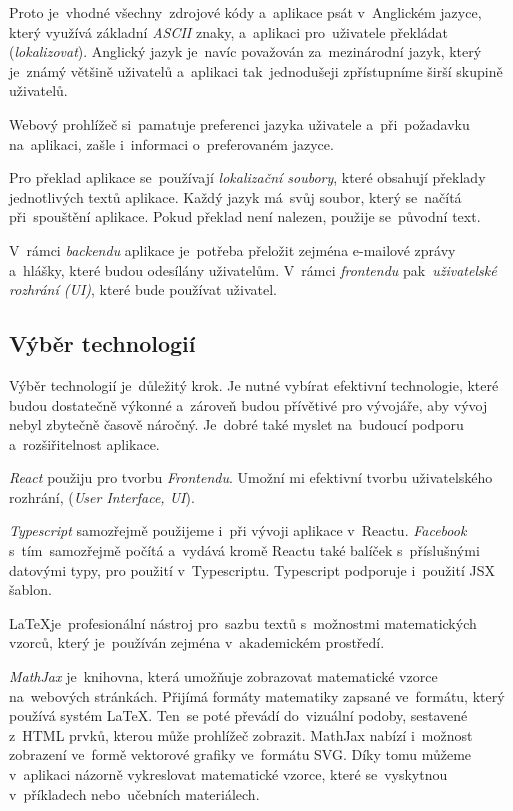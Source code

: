 \documentclass[10pt,a4paper]{article}
\begin{document}
        Proto je~vhodné všechny~zdrojové kódy a~aplikace psát v~Anglickém jazyce, který využívá základní \emph{ASCII} znaky, a~aplikaci pro~uživatele překládat (\emph{lokalizovat}). Anglický jazyk je~navíc považován za~mezinárodní jazyk, který je~známý většině uživatelů a~aplikaci tak~jednodušeji zpřístupníme širší skupině uživatelů.
        
        Webový prohlížeč si~pamatuje preferenci jazyka uživatele a~při~požadavku na~aplikaci, zašle i~informaci o~preferovaném jazyce.

        Pro překlad aplikace se~používají \emph{lokalizační soubory}, které obsahují překlady jednotlivých textů aplikace. Každý jazyk má~svůj soubor, který se~načítá při~spouštění aplikace. Pokud překlad není nalezen, použije se~původní text.

        V~rámci \emph{backendu} aplikace je~potřeba přeložit zejména e-mailové zprávy a~hlášky, které budou odesílány uživatelům. V~rámci \emph{frontendu} pak~\emph{uživatelské rozhrání (UI)}, které bude používat uživatel.

        \subsection{Výběr technologií}
            Výběr technologií je~důležitý krok. Je nutné vybírat efektivní technologie, které budou dostatečně výkonné a~zároveň budou
            přívětivé pro vývojáře, aby vývoj nebyl zbytečně časově náročný. Je~dobré také myslet na~budoucí podporu a~rozšiřitelnost aplikace.

            \emph{React} použiju pro tvorbu \emph{Frontendu}. Umožní mi efektivní tvorbu uživatelského rozhrání, (\emph{User Interface, UI}).

            \emph{Typescript} samozřejmě použijeme i~při vývoji aplikace v~Reactu. \emph{Facebook} s~tím~samozřejmě počítá a~vydává
            kromě Reactu také balíček s~příslušnými datovými typy, pro použití v~Typescriptu. Typescript podporuje i~použití JSX šablon. \cite[Refeerence/Handbook/JSX]{TypeScript}

            \LaTeX je~profesionální nástroj pro~sazbu textů s~možnostmi matematických vzorců, který je~používán zejména v~akademickém prostředí.\cite{Rybicka2003:latex}
            
            \emph{MathJax} je~knihovna, která umožňuje zobrazovat matematické vzorce na~webových stránkách. Přijímá formáty matematiky zapsané ve~formátu, který používá systém \LaTeX. Ten~se poté převádí do~vizuální podoby, sestavené z~HTML prvků, kterou může prohlížeč zobrazit. MathJax nabízí i~možnost zobrazení ve~formě vektorové grafiky ve~formátu SVG. Díky tomu můžeme v~aplikaci názorně vykreslovat matematické vzorce, které se~vyskytnou v~příkladech nebo~učebních materiálech.\cite{abclinuxuMatematickxE9Vzorce}
\end{document}

